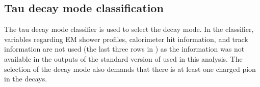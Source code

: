 \subsection{Tau decay mode classification}

The tau decay mode classifier is used to select the \tauToPionBoth decay mode. In the classifier, variables regarding EM shower profiles, calorimeter hit information, and track information are not used (the last three rows in ) as the information was not available in the outputs of the standard version of \pandora used in this analysis. The selection of the \tauToPionBoth decay mode also demands that there is at least one charged pion in the \tauToPionBoth decays.

